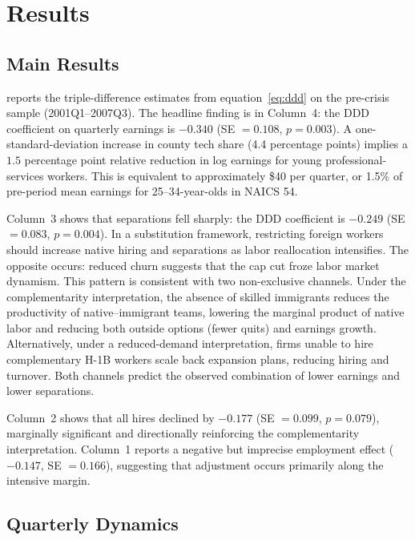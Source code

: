 \documentclass[12pt]{article}
\begin{document}
\section{Results}

\subsection{Main Results}

 reports the triple-difference estimates from equation~\eqref{eq:ddd} on the pre-crisis sample (2001Q1--2007Q3). The headline finding is in Column~4: the DDD coefficient on quarterly earnings is $-0.340$ (SE $= 0.108$, $p = 0.003$). A one-standard-deviation increase in county tech share (4.4 percentage points) implies a $1.5$ percentage point relative reduction in log earnings for young professional-services workers. This is equivalent to approximately \$40 per quarter, or 1.5\% of pre-period mean earnings for 25--34-year-olds in NAICS 54.

Column~3 shows that separations fell sharply: the DDD coefficient is $-0.249$ (SE $= 0.083$, $p = 0.004$). In a substitution framework, restricting foreign workers should increase native hiring and separations as labor reallocation intensifies. The opposite occurs: reduced churn suggests that the cap cut froze labor market dynamism. This pattern is consistent with two non-exclusive channels. Under the complementarity interpretation, the absence of skilled immigrants reduces the productivity of native--immigrant teams, lowering the marginal product of native labor and reducing both outside options (fewer quits) and earnings growth. Alternatively, under a reduced-demand interpretation, firms unable to hire complementary H-1B workers scale back expansion plans, reducing hiring and turnover. Both channels predict the observed combination of lower earnings and lower separations.

Column~2 shows that all hires declined by $-0.177$ (SE $= 0.099$, $p = 0.079$), marginally significant and directionally reinforcing the complementarity interpretation. Column~1 reports a negative but imprecise employment effect ($-0.147$, SE $= 0.166$), suggesting that adjustment occurs primarily along the intensive margin.



\subsection{Quarterly Dynamics}
\end{document}
